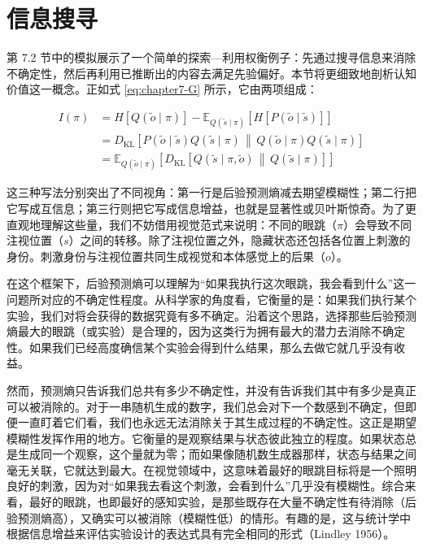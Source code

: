 \section{信息搜寻}

第 7.2 节中的模拟展示了一个简单的探索---利用权衡例子：先通过搜寻信息来消除不确定性，然后再利用已推断出的内容去满足先验偏好。本节将更细致地剖析认知价值这一概念。正如式 \eqref{eq:chapter7-G} 所示，它由两项组成：

\begin{equation}
\begin{aligned}
I(\pi) &= H[Q(\tilde{o}\mid \pi)]-\mathbb{E}_{Q(\tilde{s}\mid \pi)}[H[P(\tilde{o}\mid \tilde{s})]] \\
&= D_{\mathrm{KL}}\!\left[P(\tilde{o}\mid \tilde{s})Q(\tilde{s}\mid \pi)\,\middle\|\,Q(\tilde{o}\mid \pi)Q(\tilde{s}\mid \pi)\right] \\
&= \mathbb{E}_{Q(\tilde{o}\mid \pi)}\!\left[D_{\mathrm{KL}}\!\left[Q(\tilde{s}\mid \pi,\tilde{o})\,\middle\|\,Q(\tilde{s}\mid \pi)\right]\right]
\end{aligned}
\label{eq:chapter7-I}
\end{equation}

这三种写法分别突出了不同视角：第一行是后验预测熵减去期望模糊性；第二行把它写成互信息；第三行则把它写成信息增益，也就是显著性或贝叶斯惊奇。为了更直观地理解这些量，我们不妨借用视觉范式来说明：不同的眼跳（$\pi$）会导致不同注视位置（$s$）之间的转移。除了注视位置之外，隐藏状态还包括各位置上刺激的身份。刺激身份与注视位置共同生成视觉和本体感觉上的后果（$o$）。

在这个框架下，后验预测熵可以理解为“如果我执行这次眼跳，我会看到什么”这一问题所对应的不确定性程度。从科学家的角度看，它衡量的是：如果我们执行某个实验，我们对将会获得的数据究竟有多不确定。沿着这个思路，选择那些后验预测熵最大的眼跳（或实验）是合理的，因为这类行为拥有最大的潜力去消除不确定性。如果我们已经高度确信某个实验会得到什么结果，那么去做它就几乎没有收益。

然而，预测熵只告诉我们总共有多少不确定性，并没有告诉我们其中有多少是真正可以被消除的。对于一串随机生成的数字，我们总会对下一个数感到不确定，但即便一直盯着它们看，我们也永远无法消除关于其生成过程的不确定性。这正是期望模糊性发挥作用的地方。它衡量的是观察结果与状态彼此独立的程度。如果状态总是生成同一个观察，这个量就为零；而如果像随机数生成器那样，状态与结果之间毫无关联，它就达到最大。在视觉领域中，这意味着最好的眼跳目标将是一个照明良好的刺激，因为对“如果我去看这个刺激，会看到什么”几乎没有模糊性。综合来看，最好的眼跳，也即最好的感知实验，是那些既存在大量不确定性有待消除（后验预测熵高），又确实可以被消除（模糊性低）的情形。有趣的是，这与统计学中根据信息增益来评估实验设计的表达式具有完全相同的形式（Lindley 1956）。


